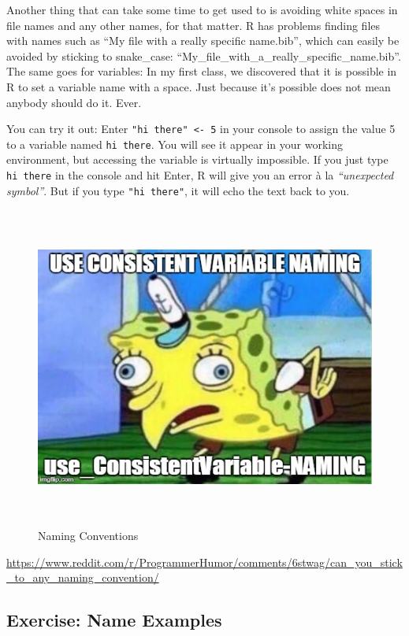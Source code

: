 \documentclass[
]{book}
\begin{document}
Another thing that can take some time to get used to is avoiding white spaces in file names and any other names, for that matter.
R has problems finding files with names such as ``My file with a really specific name.bib'', which can easily be avoided by sticking to snake\_case: ``My\_file\_with\_a\_really\_specific\_name.bib''.
The same goes for variables: In my first class, we discovered that it is possible in R to set a variable name with a space.
Just because it's possible does not mean anybody should do it. Ever.

You can try it out: Enter \texttt{"hi\ there"\ \textless{}-\ 5} in your console to assign the value 5 to a variable named \texttt{hi\ there}.
You will see it appear in your working environment, but accessing the variable is virtually impossible.
If you just type \texttt{hi\ there} in the console and hit Enter, R will give you an error à la \emph{``unexpected symbol''}.
But if you type \texttt{"hi\ there"}, it will echo the text back to you.

\begin{figure}
\centering
\includegraphics[width=\textwidth,height=4.16667in]{./img/varname.webp}
\caption{Naming Conventions}\label{id}
\end{figure}

\url{https://www.reddit.com/r/ProgrammerHumor/comments/6stwag/can_you_stick_to_any_naming_convention/}

\subsection{Exercise: Name Examples}\label{exercise-name-examples}
\end{document}
